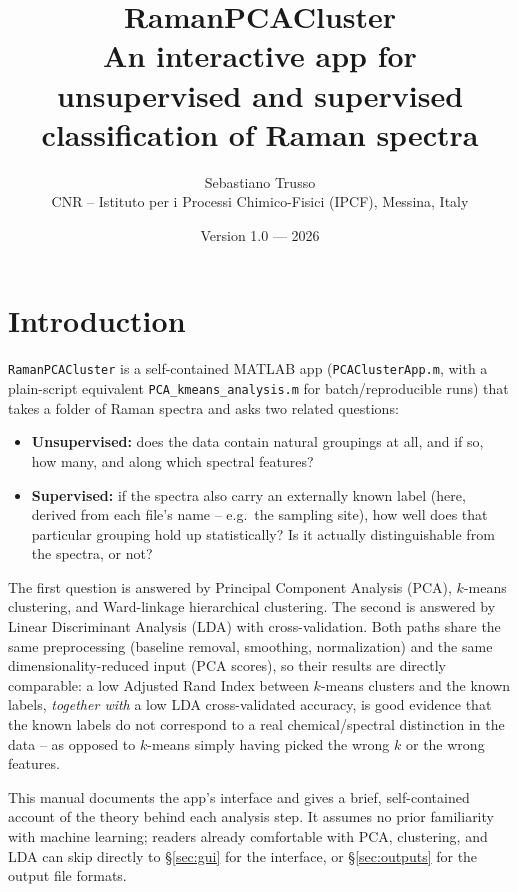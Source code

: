 \documentclass[11pt,a4paper]{article}
\title{\textbf{RamanPCACluster}\\[4pt]
       \large An interactive app for unsupervised and supervised\\
       classification of Raman spectra}
\author{Sebastiano Trusso \\ CNR -- Istituto per i Processi Chimico-Fisici (IPCF), Messina, Italy}
\date{Version 1.0 --- 2026}
\newcommand{\code}[1]{\texttt{#1}}
\begin{document}
\maketitle
\tableofcontents
\newpage

\section{Introduction}
\code{RamanPCACluster} is a self-contained MATLAB app (\code{PCAClusterApp.m}, with
a plain-script equivalent \code{PCA\_kmeans\_analysis.m} for batch/reproducible
runs) that takes a folder of Raman spectra and asks two related questions:

\begin{itemize}
  \item \textbf{Unsupervised:} does the data contain natural groupings at all,
  and if so, how many, and along which spectral features?
  \item \textbf{Supervised:} if the spectra also carry an externally known
  label (here, derived from each file's name -- e.g.\ the sampling site),
  how well does that particular grouping hold up statistically? Is it
  actually distinguishable from the spectra, or not?
\end{itemize}

The first question is answered by Principal Component Analysis (PCA),
$k$-means clustering, and Ward-linkage hierarchical clustering. The second is
answered by Linear Discriminant Analysis (LDA) with cross-validation. Both
paths share the same preprocessing (baseline removal, smoothing,
normalization) and the same dimensionality-reduced input (PCA scores), so
their results are directly comparable: a low Adjusted Rand Index between
$k$-means clusters and the known labels, \emph{together with} a low LDA
cross-validated accuracy, is good evidence that the known labels do not
correspond to a real chemical/spectral distinction in the data -- as opposed
to $k$-means simply having picked the wrong $k$ or the wrong features.

\begin{tbnote}
This manual documents the app's interface and gives a brief, self-contained
account of the theory behind each analysis step. It assumes no prior
familiarity with machine learning; readers already comfortable with PCA,
clustering, and LDA can skip directly to \S\ref{sec:gui} for the interface,
or \S\ref{sec:outputs} for the output file formats.
\end{tbnote}
\end{document}
